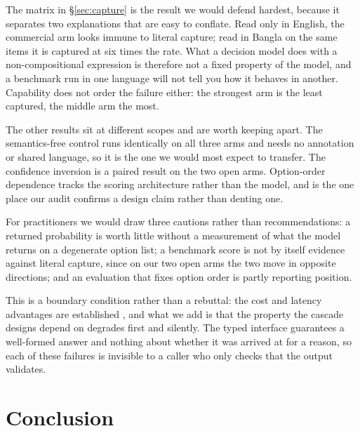 \documentclass[11pt]{article}
\begin{document}
The matrix in \S\ref{sec:capture} is the result we would defend hardest,
because it separates two explanations that are easy to conflate. Read only in
English, the commercial arm looks immune to literal capture; read in Bangla on
the same items it is captured at six times the rate. What a decision model does
with a non-compositional expression is therefore not a fixed property of the
model, and a benchmark run in one language will not tell you how it behaves in
another. Capability does not order the failure either: the strongest arm is the
least captured, the middle arm the most.

The other results sit at different scopes and are worth keeping apart. The
semantics-free control runs identically on all three arms and needs no
annotation or shared language, so it is the one we would most expect to
transfer. The confidence inversion is a paired result on the two open arms.
Option-order dependence tracks the scoring architecture rather than the model,
and is the one place our audit confirms a design claim rather than denting
one.

For practitioners we would draw three cautions rather than
recommendations: a returned probability is worth little without a measurement of
what the model returns on a degenerate option list; a benchmark score is not by
itself evidence against literal capture, since on our two open arms the two move
in opposite directions; and an evaluation that fixes option order is partly
reporting position.

This is a boundary condition rather than a rebuttal: the cost and latency
advantages are established \citep{tang2026audit,rao2026rubric}, and what we add
is that the property the cascade designs depend on degrades first and silently.
The typed interface guarantees a well-formed answer and nothing about whether it
was arrived at for a reason, so each of these failures is invisible to a caller
who only checks that the output validates.

\section{Conclusion}
\end{document}
